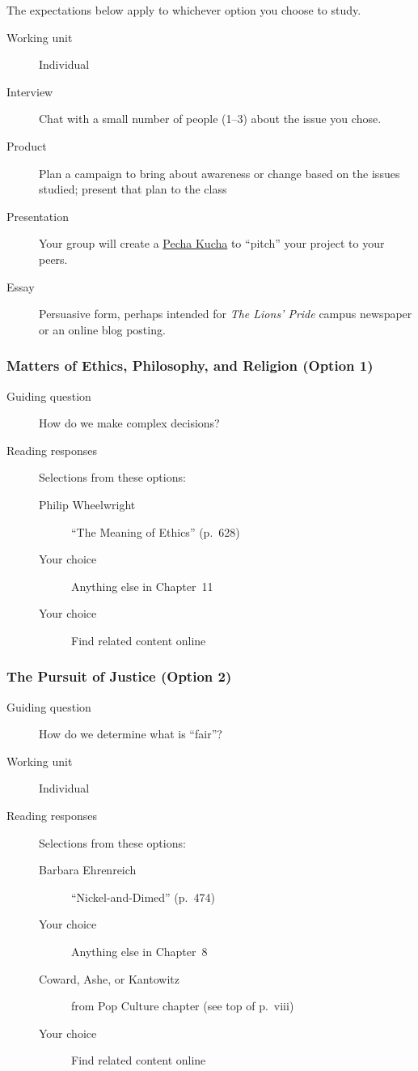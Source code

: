 \documentclass[12pt,oneside]{amsart}	%
\begin{document}
The expectations below apply to whichever option you choose to study.
\begin{description}
	\item [Working unit] Individual
	\item [Interview] Chat with a small number of people (1--3) about the issue you chose.
	\item [Product] Plan a campaign to bring about awareness or change based on the issues studied; present that plan to the class
	\item[Presentation] Your group will create a \href{http://www.pechakucha.org/faq}{Pecha Kucha} to ``pitch'' your project to your peers.
	\item [Essay] Persuasive form, perhaps intended for \emph{The Lions' Pride} campus newspaper or an online blog posting.
\end{description}

\subsubsection{Matters of Ethics, Philosophy, and Religion (Option 1)} %
\label{sub:matters_of_ethics_philosophy_and_religion}
\begin{description}
	\item[Guiding question] How do we make complex decisions?
	\item [Reading responses] Selections from these options:
	\begin{description}
		\item[Philip Wheelwright] ``The Meaning of Ethics'' (p.~628)
		\item[Your choice] Anything else in Chapter~11
		\item[Your choice] Find related content online
	\end{description}
\end{description}

\subsubsection{The Pursuit of Justice (Option 2)} %
\label{sub:the_pursuit_of_justice}
\begin{description}
	\item[Guiding question] How do we determine what is ``fair''?
	\item [Working unit] Individual
	\item [Reading responses] Selections from these options:
	\begin{description}
		\item[Barbara Ehrenreich] ``Nickel-and-Dimed'' (p.~474)
		\item[Your choice] Anything else in Chapter~8
		\item[Coward, Ashe, or Kantowitz] from Pop Culture chapter (see top of p.~viii)
		\item[Your choice] Find related content online
	\end{description}
\end{description}
\end{document}

